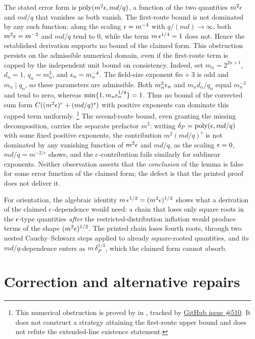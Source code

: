 \documentclass[11pt]{article}
\DeclareMathOperator{\poly}{poly}
\renewcommand{\ghissue}[1]{%
  \href{https://github.com/Dengnifer/MIPStarRE-QPBT/issues/#1}{GitHub issue \##1}}
\begin{document}
The stated error form is $\poly(m^2\eps, md/q)$, a function of the two
quantities $m^2\epsilon$ and $md/q$ that vanishes as both vanish.  The
first-route bound is not dominated by any such function: along the
scaling $\epsilon = m^{-4}$ with $q/(md) \to \infty$, both $m^2\epsilon = m^{-2}$
and $md/q$ tend to $0$, while the term $m\,\epsilon^{1/4} = 1$ does not.
Hence the established derivation supports no bound of the claimed form.
This obstruction persists on the admissible numerical domain, even if the
first-route term is capped by the independent unit bound on consistency.
Indeed, set $m_n=2^{2n+1}$, $d_n=1$, $q_n=m_n^3$, and
$\epsilon_n=m_n^{-4}$. The field-size exponent $6n+3$ is odd and
$m_n\mid q_n$, so these parameters are admissible. Both $m_n^2\epsilon_n$
and $m_nd_n/q_n$ equal $m_n^{-2}$ and tend to zero, whereas
$\min\{1,m_n\epsilon_n^{1/4}\}=1$. Thus no bound of the corrected sum form
$C((m^2\epsilon)^r+(md/q)^s)$ with positive exponents can dominate this
capped term uniformly.%
\footnote{This numerical obstruction is proved by
 in
, tracked by
\ghissue{510}. It does not construct a strategy attaining the first-route
upper bound and does not refute the extended-line existence statement.}
The second-route bound, even granting the missing decomposition, carries
the separate prefactor $m^2$: writing $\delta_P = \poly(\eps, md/q)$
with some fixed positive exponents, the contribution
$m^2 (md/q)^{c}$ is not dominated by any vanishing function of $m^2\epsilon$
and $md/q$, as the scaling $\epsilon = 0$, $md/q = m^{-2/c}$ shows, and the
$\epsilon$-contribution fails similarly for sublinear exponents.  Neither
observation asserts that the \emph{conclusion} of the lemma is false for
some error function of the claimed form; the defect is that the printed
proof does not deliver it.

For orientation, the algebraic identity
$m\,\epsilon^{1/2} = (m^2\epsilon)^{1/2}$ shows what a derivation of the claimed
$\epsilon$-dependence would need: a chain that loses only square roots in the
$\epsilon$-type quantities \emph{after} the restricted-distribution
inflation would produce terms of the shape $(m^2\epsilon)^{1/2}$.  The
printed chain loses fourth roots, through two nested Cauchy--Schwarz
steps applied to already square-rooted quantities, and its
$md/q$-dependence enters as $m\,\delta_P^{1/4}$, which the claimed form
cannot absorb.

\section{Correction and alternative repairs}
\end{document}
